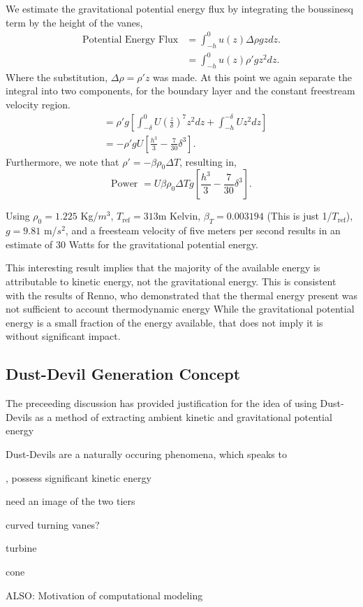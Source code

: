We estimate the gravitational potential
energy flux by integrating the boussinesq term by the height of the vanes, 
\begin{align*}
  \text{Potential Energy Flux} & = \int_{-h}^0 u(z) \Delta \rho g z dz. \\
  & = \int_{-h}^0 u(z) \rho' g z^2 dz. 
\end{align*}
Where the substitution, $\Delta \rho = \rho' z$ was made. At 
this point we again separate the integral into two components, 
for the boundary layer and the constant freestream velocity region. 
\begin{align*}
  & = \rho' g \left[ \int_{-\delta}^{0} U \left( \frac{z}{\delta} \right)^7 z^2 dz 
      + \int_{-h}^{-\delta} U z^2 dz \right] \\
  & = -\rho' g U \left[ \frac{h^3}{3} - \frac{7}{30} \delta^3 \right].
\end{align*}
Furthermore, we
note that $\rho' = -\beta \rho_0 \Delta T$, resulting in, 
%
%
\begin{equation}
 \text{Power } = U \beta \rho_0 \Delta T g \left[ \frac{h^3}{3} -
					    \frac{7}{30} \delta^3
					   \right]. 
\end{equation}

Using $\rho_0 = 1.225$ Kg/$m^3$, $T_{\text{ref}}=313$m Kelvin, $\beta_T = 0.003194$
(This is just 1/$T_{\text{ref}}$), $g=9.81$ m/$s^2$, and a freesteam
velocity of five meters per second results in an
estimate of 30 Watts for the gravitational potential energy. 

This interesting result implies that the majority of the available
energy is attributable to kinetic energy, not the gravitational
energy. This is consistent with the results of Renno, who demonstrated
that the thermal energy present was not sufficient to account 
thermodynamic energy 
%
%
While the gravitational potential energy is a small fraction of the
energy available, that does not imply it is without significant impact. 

\subsection{Dust-Devil Generation Concept}

The preceeding discussion has provided justification for the idea of
using Dust-Devils as a method of extracting ambient kinetic and
gravitational potential energy 


Dust-Devils are a naturally occuring phenomena, which speaks to 

, possess
significant kinetic energy 

need an image of the two tiers

curved turning vanes?

turbine

cone

ALSO: Motivation of computational modeling


